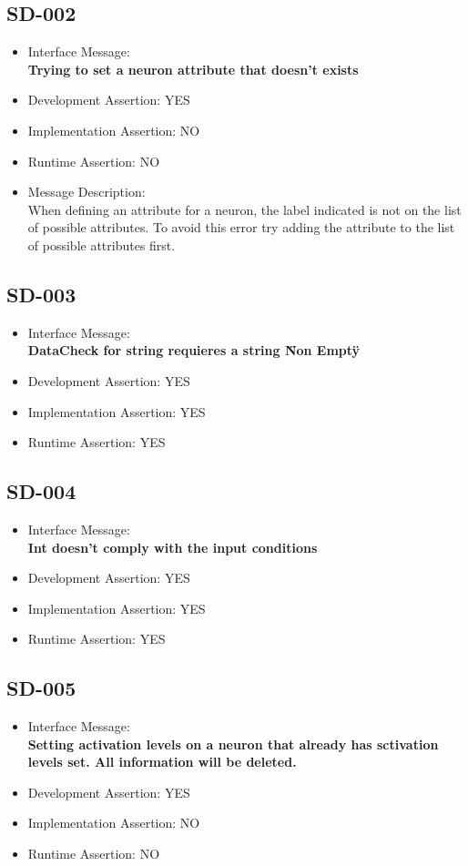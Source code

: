 \subsection{SD-002}
\begin{itemize}
  \item Interface Message:\\[1em]
    \textbf{Trying to set a neuron attribute that doesn't exists}
  \item Development Assertion: YES
  \item Implementation Assertion: NO
  \item Runtime Assertion: NO
  \item Message Description:\\[1em]
    When defining an attribute for a neuron, the label indicated is not on the list of possible attributes. To avoid this error try adding the attribute to the list of possible attributes first.
\end{itemize}

\subsection{SD-003}
\begin{itemize}
  \item Interface Message:\\[1em]
    \textbf{DataCheck for string requieres a string \"Non Empty\"}
  \item Development Assertion: YES
  \item Implementation Assertion: YES
  \item Runtime Assertion: YES
\end{itemize}

\subsection{SD-004}
\begin{itemize}
  \item Interface Message:\\[1em]
    \textbf{Int doesn't comply with the input conditions}
  \item Development Assertion: YES
  \item Implementation Assertion: YES
  \item Runtime Assertion: YES
\end{itemize}

\subsection{SD-005}
\begin{itemize}
  \item Interface Message:\\[1em]
    \textbf{Setting activation levels on a neuron that already has sctivation levels set. All information will be deleted.}
  \item Development Assertion: YES
  \item Implementation Assertion: NO
  \item Runtime Assertion: NO
\end{itemize}

